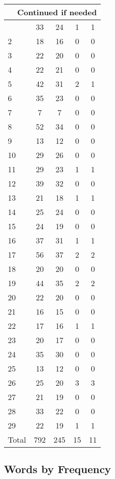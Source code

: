 \begin{center}
\begin{longtable}{l|c|c|c|c}
\hline \multicolumn{5}{|r|}{{Continued if needed}} \\ \hline
\endfoot 
1 & 33 & 24 & 1 & 1\\ \hline
2 & 18 & 16 & 0 & 0\\ \hline
3 & 22 & 20 & 0 & 0\\ \hline
4 & 22 & 21 & 0 & 0\\ \hline
5 & 42 & 31 & 2 & 1\\ \hline
6 & 35 & 23 & 0 & 0\\ \hline
7 & 7 & 7 & 0 & 0\\ \hline
8 & 52 & 34 & 0 & 0\\ \hline
9 & 13 & 12 & 0 & 0\\ \hline
10 & 29 & 26 & 0 & 0\\ \hline
11 & 29 & 23 & 1 & 1\\ \hline
12 & 39 & 32 & 0 & 0\\ \hline
13 & 21 & 18 & 1 & 1\\ \hline
14 & 25 & 24 & 0 & 0\\ \hline
15 & 24 & 19 & 0 & 0\\ \hline
16 & 37 & 31 & 1 & 1\\ \hline
17 & 56 & 37 & 2 & 2\\ \hline
18 & 20 & 20 & 0 & 0\\ \hline
19 & 44 & 35 & 2 & 2\\ \hline
20 & 22 & 20 & 0 & 0\\ \hline
21 & 16 & 15 & 0 & 0\\ \hline
22 & 17 & 16 & 1 & 1\\ \hline
23 & 20 & 17 & 0 & 0\\ \hline
24 & 35 & 30 & 0 & 0\\ \hline
25 & 13 & 12 & 0 & 0\\ \hline
26 & 25 & 20 & 3 & 3\\ \hline
27 & 21 & 19 & 0 & 0\\ \hline
28 & 33 & 22 & 0 & 0\\ \hline
29 & 22 & 19 & 1 & 1\\ \hline
\hline \hline
Total & 792 & 245 & 15 & 11



\end{longtable}
\end{center}

 
\subsection{Words by Frequency}

